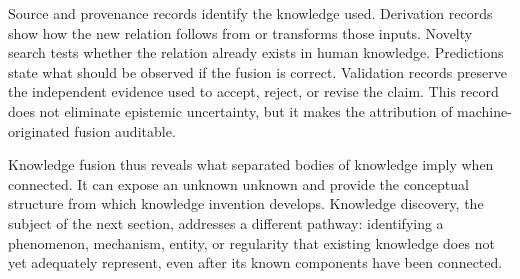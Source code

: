 Source and provenance records identify the knowledge used. Derivation records
show how the new relation follows from or transforms those inputs. Novelty
search tests whether the relation already exists in human knowledge.
Predictions state what should be observed if the fusion is correct. Validation
records preserve the independent evidence used to accept, reject, or revise the
claim. This record does not eliminate epistemic uncertainty, but it makes the
attribution of machine-originated fusion auditable.

Knowledge fusion thus reveals what separated bodies of knowledge imply when
connected. It can expose an unknown unknown and provide the conceptual
structure from which knowledge invention develops. Knowledge discovery, the
subject of the next section, addresses a different pathway: identifying a
phenomenon, mechanism, entity, or regularity that existing knowledge does not
yet adequately represent, even after its known components have been connected.
